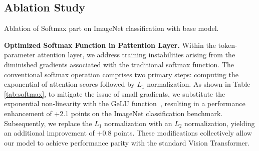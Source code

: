 \documentclass{article} %
\begin{document}
\subsection{Ablation Study} \label{sec:ablation}
\begin{table}[h]
  \begin{minipage}{0.46\linewidth}
  \centering
  \vspace{-2pt}
  \caption{Ablation of Softmax part on ImageNet classification with base model.}
  \label{tab:softmax}
  \end{minipage}
  \hfill
  \begin{minipage}{0.52\linewidth}
  \centering
  \caption{Ablation of non-parametric layer normalization on ImageNet classification with base model.}
  \label{tab:layernorm-nonparam}
  \end{minipage}
  \vspace{-8pt}
\end{table}
\textbf{Optimized Softmax Function in Pattention Layer.} Within the token-parameter attention layer, we address training instabilities arising from the diminished gradients associated with the traditional softmax function. The conventional softmax operation comprises two primary steps: computing the exponential of attention scores followed by $L_1$ normalization. As shown in Table \ref{tab:softmax}, to mitigate the issue of small gradients, we substitute the exponential non-linearity with the GeLU function~\citep{hendrycks2016gaussian}, resulting in a performance enhancement of +2.1 points on the ImageNet classification benchmark. Subsequently, we replace the $L_1$ normalization with an $L_2$ normalization, yielding an additional improvement of +0.8 points. These modifications collectively allow our model to achieve performance parity with the standard Vision Transformer.
\end{document}
